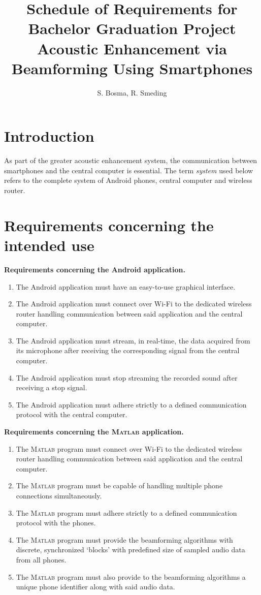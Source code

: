 \documentclass[a4paper]{article}
\newcommand{\matlab}{\textsc{Matlab} } %
\begin{document}
\title{{\sffamily Schedule of Requirements for Bachelor Graduation Project\\Acoustic Enhancement via Beamforming Using Smartphones}}
\author{{\sffamily\small S. Bosma, R. Smeding}}
\date{}
\maketitle
\section{Introduction}
As part of the greater acoustic enhancement system, the communication between smartphones and the central computer is essential. The term \emph{system} used below refers to the complete system of Android phones, central computer and wireless router.

\section{Requirements concerning the intended use}
\textbf{Requirements concerning the Android application.}
\begin{enumerate}
\item The Android application must have an easy-to-use graphical interface.
\item The Android application must connect over Wi-Fi to the dedicated wireless router handling communication between said application and the central computer.
\item The Android application must stream, in real-time, the data acquired from its microphone after receiving the corresponding signal from the central computer.
\item The Android application must stop streaming the recorded sound after receiving a stop signal.
\item The Android application must adhere strictly to a defined communication protocol with the central computer.
\end{enumerate}

\textbf{Requirements concerning the \matlab application.}
\begin{enumerate}
\item The \matlab program must connect over Wi-Fi to the dedicated wireless router handling communication between said application and the central computer.
\item The \matlab program must be capable of handling multiple phone connections simultaneously.
\item The \matlab program must adhere strictly to a defined communication protocol with the phones.
\item The \matlab program must provide the beamforming algorithms with discrete, synchronized `blocks' with predefined size of sampled audio data from all phones.
\item The \matlab program must also provide to the beamforming algorithms a unique phone identifier along with said audio data.
\end{enumerate}
\end{document}
